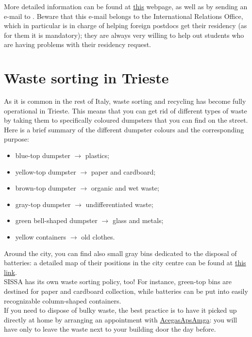 \documentclass{sissavademecum}
\begin{document}
More detailed information can be found at \href{http://www.welcomeoffice.fvg.it/practical-info/entry-and-stay/residence-registration-iscrizione-anagrafica/}{this} webpage, as well as by sending an e-mail to . Beware that this e-mail belongs to the International Relations Office, which in particular is in charge of helping foreign postdocs get their residency (as for them it is mandatory); they are always very willing to help out students who are having problems with their residency request.


\section{Waste sorting in Trieste}

As it is common in the rest of Italy, waste sorting and recycling has become fully operational in Trieste. This means that you can get rid of different types of waste by taking them to specifically coloured dumpsters that you can find on the street. Here is a brief summary of the different dumpster colours and the corresponding purpose:
\begin{itemize}
    \item blue-top dumpster $\to$ plastics;
    \item yellow-top dumpster $\to$ paper and cardboard;
    \item brown-top dumpster $\to$ organic and wet waste;
    \item gray-top dumpster $\to$ undifferentiated waste;
    \item green bell-shaped dumpster $\to$ glass and metals;
    \item yellow containers $\to$ old clothes.
\end{itemize}
Around the city, you can find also small gray bins dedicated to the disposal of batteries: a detailed map of their positions in the city centre can be found at \href{http://wwftrieste.altervista.org/mappapile.shtml}{this link}. \\
SISSA has its own waste sorting policy, too! For instance, green-top bins are destined for paper and cardboard collection, while batteries can be put into easily recognizable column-shaped containers. \\
If you need to dispose of bulky waste, the best practice is to have it picked up directly at home by arranging an appointment with \href{https://www.acegasapsamga.it/clienti/casa/casa_servizio_ambiente/casa_aaa_ambiente_ritiro_ingombranti/32424.html}{AcegasApsAmga}: you will have only to leave the waste next to your building door the day before. \\
\end{document}
